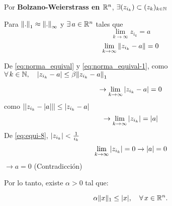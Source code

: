 {	Por \textbf{Bolzano-Weierstrass en $\mathbb{R}^{n}$}, $\exists (z_{i_k}) \subset (z_k)_{k\in \mathbb{N}}$

	Para  $\norm{.}_1 \approx \norm{.}_{\infty}$ y  $\exists \, a \in \mathbb{R}^{n}$ tales que
	$$
		\lim\limits_{k\to \infty} z_{i_k}=a
	$$
	\begin{equation}
		\lim\limits_{k\to \infty} \norm{ z_{i_k} -a }=0 \label{eq:norma_equival-1}
	\end{equation}


	De \eqref{eq:norma_equival} y \eqref{eq:norma_equival-1}, como $\forall\, k \in \mathbb{N}, \quad \abs{z_{i_k}-a}\leq \beta\norm{z_{i_k}-a}_1 $

	$$
		\rightarrow  \lim\limits_{k\to \infty} \abs{z_{i_k}-a} = 0
	$$
	como $   \abs{\abs{z_{i_k} -\abs{a} }}\leq \abs{z_{i_k}-a}$
	$$
		\rightarrow  \lim\limits_{k\to \infty} \abs{z_{i_k}}=\abs{a}
	$$
	De \eqref{eq:equi-8}, $\abs{z_{i_k} }< \frac{1}{i_k}$
	$$
		\lim\limits_{k \to \infty} \abs{z_{i_k}} = 0 \rightarrow \abs{a}=0
	$$
	$\rightarrow a=0$ (Contradicción)

	Por lo tanto, existe \( \alpha > 0 \) tal que:

	\[
		\alpha \|x\|_1 \leq \abs{x}, \quad \forall\, x \in \mathbb{R}^n.
	\]
}

